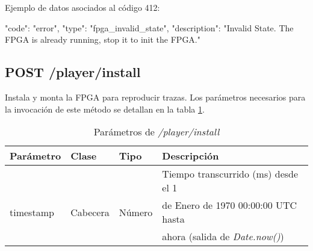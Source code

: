 \begin{itemize}
{\begin{minipage}{\textwidth}
Ejemplo de datos asociados al código 412:

\begin{code}[language=json]
{
  "code": "error",
  "type": "fpga_invalid_state",
  "description": "Invalid State. The FPGA is already running, stop it to init the FPGA."
}
\end{code}
\end{minipage}
}

\end{itemize}

%
%
\subsection{POST /player/install}
Instala y monta la \gls{FPGA} para reproducir \glspl{traza}. Los parámetros necesarios para la invocación de este método se detallan en la tabla \ref{extra:api:playerinstall:invocacion}.

\begin{table}[H]
\centering
\begin{tabular}{|l|l|l|l|}
\hline
\rowcolor[HTML]{F5F5F5}
\textbf{Parámetro}  & \textbf{Clase} & \textbf{Tipo} & \textbf{Descripción}                  \\ \hline
                    &                &               & Tiempo transcurrido (ms) desde el 1   \\
timestamp           & Cabecera       & Número        & de Enero de 1970 00:00:00 UTC hasta   \\
                    &                &               & ahora (salida de \textit{Date.now()}) \\ \hline
\end{tabular}
\caption{Parámetros de \textit{/player/install}}
\label{extra:api:playerinstall:invocacion}
\end{table}

